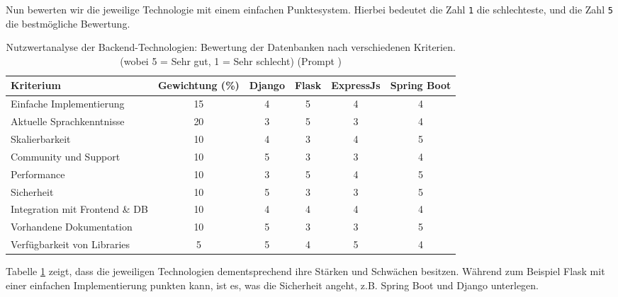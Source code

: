 Nun bewerten wir die jeweilige Technologie mit einem einfachen Punktesystem. Hierbei bedeutet die Zahl \texttt{1} die schlechteste, und die Zahl \texttt{5} die bestmögliche Bewertung.

\begin{table}[H]
	\centering
	\renewcommand{\arraystretch}{1.2}
	\begin{tabular}{|l|c|c|c|c|c|}
		\hline
		\rowcolor[HTML]{B6D7A8} \textbf{Kriterium} & \textbf{Gewichtung (\%)} & \textbf{Django} & \textbf{Flask} & \textbf{ExpressJs} & \textbf{Spring Boot} \\
		\hline
		Einfache Implementierung & 15 & 4 & 5 & 4 & 4 \\
		\hline
		Aktuelle Sprachkenntnisse & 20 & 3 & 5 & 3 & 4 \\
		\hline
		Skalierbarkeit & 10 & 4 & 3 & 4 & 5 \\
		\hline
		Community und Support & 10 & 5 & 3 & 3 & 4 \\
		\hline
		Performance & 10 & 3 & 5 & 4 & 5 \\
		\hline
		Sicherheit & 10 & 5 & 3 & 3 & 5 \\
		\hline
		Integration mit Frontend \& DB & 10 & 4 & 4 & 4 & 4 \\
		\hline
		Vorhandene Dokumentation & 10 & 5 & 3 & 3 & 5 \\
		\hline
		Verfügbarkeit von Libraries & 5 & 5 & 4 & 5 & 4 \\
		\hline
	\end{tabular}
	\caption{Nutzwertanalyse der Backend-Technologien: Bewertung der Datenbanken nach verschiedenen Kriterien. (wobei 5 = Sehr gut, 1 = Sehr schlecht) (Prompt \cite{prompt-gpt-google-sheets-to-table})}
    \label{table-analytische-nwa-backend}
\end{table}

Tabelle \ref{table-analytische-nwa-backend} zeigt, dass die jeweiligen Technologien dementsprechend ihre Stärken und Schwächen besitzen. Während zum Beispiel Flask mit einer einfachen Implementierung punkten kann, ist es, was die Sicherheit angeht, z.B. Spring Boot und Django unterlegen.

